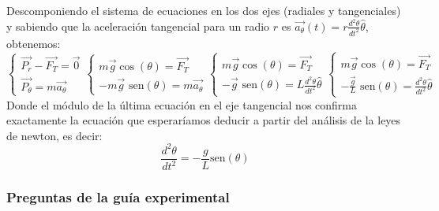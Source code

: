 Descomponiendo el sistema de ecuaciones en los dos ejes (radiales y tangenciales) y sabiendo que la aceleración tangencial para un radio $r$ es $\vec{a_\theta}(t)=r\frac{d^2\theta}{dt^2}\hat{\theta}$, obtenemos:
\begin{equation}
        \begin{cases}
             \vec{P_r}-\vec{F_T}=\vec{0}\\
             \vec{P_{\theta}}=m\vec{a_\theta}
        \end{cases}
        \begin{cases}
            m\vec{g}\cos(\theta)=\vec{F_T}\\
            -m\vec{g}\text{ sen}(\theta)=m\vec{a_\theta}
        \end{cases}
        \begin{cases}
            m\vec{g}\cos(\theta)=\vec{F_T}\\
            -\vec{g}\text{ sen}(\theta)=L\frac{d^2\theta}{dt^2}\hat{\theta}
        \end{cases}
        \begin{cases}
            m\vec{g}\cos(\theta)=\vec{F_T}\\
            -\frac{\vec{g}}{L}\text{ sen}(\theta)=\frac{d^2\theta}{dt^2}\hat{\theta}
        \end{cases}
\end{equation}
Donde el módulo de la última ecuación en el eje tangencial nos confirma exactamente la ecuación que esperaríamos deducir a partir del análisis de la leyes de newton, es decir:
\begin{equation}
    \frac{d^2\theta}{dt^2} = -\frac{g}{L} \text{sen}(\theta)
\end{equation}



\clearpage
\subsubsection{Preguntas de la guía experimental}
\label{subsubsec:contestacion-preguntas-guia}

